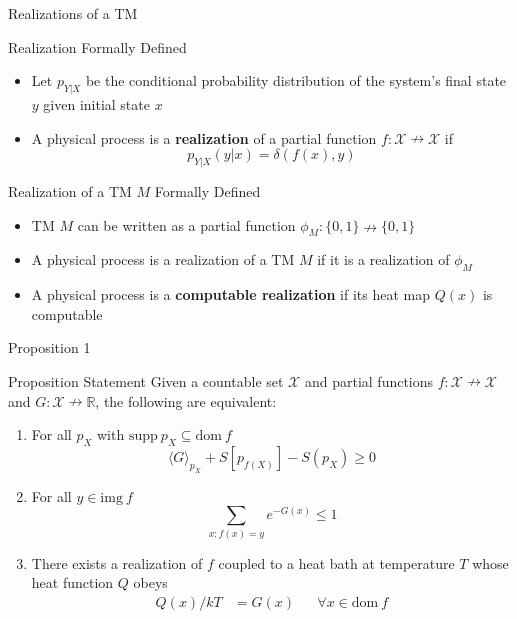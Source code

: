 
\begin{frame}{Realizations of a TM}
\begin{block}{Realization Formally Defined}
{\footnotesize
	\begin{itemize}
		\item Let $p_{Y|X}$ be the conditional probability distribution of the system's final state $y$ given initial state $x$
		\item A physical process is a \textbf{realization} of a partial function $f : \mathcal{X} \nrightarrow \mathcal{X}$ if
		\begin{equation*}
			p_{Y|X}(y|x) = \delta(f(x),y)
		\end{equation*}
	\end{itemize}		
}
\end{block}
\begin{block}{Realization of a TM $M$ Formally Defined}
{\footnotesize
	\begin{itemize}
		\item TM $M$ can be written as a partial function $\phi_M:\{0,1\} \nrightarrow\{0,1\}$
		\item A physical process is a realization of a TM $M$ if it is a realization of $\phi_M$
		\item A physical process is a \textbf{computable realization} if its heat map $Q(x)$ is computable
	\end{itemize}
}
\end{block}
\end{frame}


\begin{frame}{Proposition 1}
\begin{block}{Proposition Statement}
Given a countable set $\mathcal{X}$ and partial functions $f:\mathcal{X} \nrightarrow \mathcal{X}$ and $G:\mathcal{X} \nrightarrow \mathbb{R}$, the following are equivalent:
\begin{enumerate}
    \item For all $p_X$ with $\text{supp}\: p_X \subseteq \text{dom}\: f$
    \begin{equation*}
        \langle G \rangle_{p_X} + S[p_{f(X)}] - S(p_X) \ge 0
    \end{equation*}
    \item For all $y\in \text{img}\: f$
    \begin{equation*}
        \sum_{x:f(x) = y} e^{-G(x)} \le 1
    \end{equation*}
    \item There exists a realization of $f$ coupled to a heat bath at temperature $T$ whose heat function $Q$ obeys
    \begin{align*}
        Q(x)/kT &= G(x)  &&\forall x\in\text{dom}\:f
    \end{align*}
\end{enumerate}
\end{block}
\end{frame}

